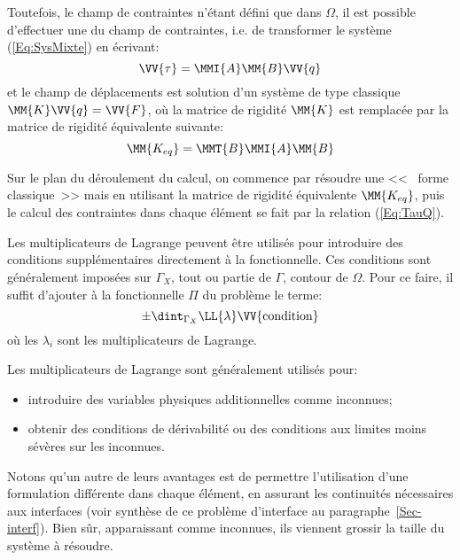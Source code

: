 \bigskip
Toutefois, le champ de contraintes n'étant défini que dans $\Omega$,
il est possible d'effectuer une  du
champ de contraintes, i.e. de transformer le système
(\ref{Eq:SysMixte}) en écrivant:
\begin{equation}
   \label{Eq:TauQ}
      \VV{\tau} = \MMI{A}\MM{B}\VV{q}
\end{equation}
et le champ de déplacements est solution d'un système de type
classique $\MM{K}\VV{q}=\VV{F}$, où la matrice de rigidité $\MM{K}$ est remplacée
par la matrice de rigidité équivalente suivante:
\begin{equation}
   \MM{K_{eq}} = \MMT{B}\MMI{A}\MM{B}
\end{equation}


\medskip
Sur le plan du déroulement du calcul, on commence par résoudre une <<~ forme classique~>>
mais en utilisant la matrice de rigidité équivalente $\MM{K_{eq}}$, puis le
calcul des contraintes dans chaque élément se fait par la relation (\ref{Eq:TauQ}).


\bigskip
Les multiplicateurs de Lagrange
peuvent être utilisés pour introduire
des conditions supplémentaires directement à la fonctionnelle.
Ces conditions sont généralement imposées sur $\Gamma_X$, tout ou
partie de $\Gamma$, contour de $\Omega$.
Pour ce faire, il suffit d'ajouter à la fonctionnelle $\Pi$
du problème le terme:
\begin{equation}
   \pm\dint_{\Gamma_X} \LL{\lambda}\VV{\text{condition}}
\end{equation}
où les $\lambda_i$ sont les multiplicateurs de Lagrange.

\medskip
Les multiplicateurs de Lagrange
sont généralement utilisés pour:
\begin{itemize}
   \item introduire des variables physiques additionnelles comme
         inconnues;
   \item obtenir des conditions de dérivabilité ou des conditions aux
         limites moins sévères sur les inconnues.
\end{itemize}

\medskip
Notons qu'un autre de leurs avantages est de permettre l'utilisation d'une formulation différente
dans chaque élément, en assurant les continuités nécessaires aux interfaces (voir synthèse
de ce problème d'interface au paragraphe~\ref{Sec-interf}).
Bien sûr, apparaissant comme inconnues, ils viennent grossir la taille du système à
résoudre.










